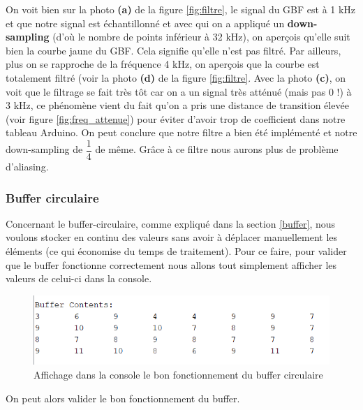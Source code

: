 \documentclass[a4paper,11pt]{article}
\begin{document}
On voit bien sur la photo \textbf{(a)} de la figure \ref{fig:filtre}, le signal du GBF est à 1 kHz et que notre signal est échantillonné et avec qui on a appliqué un \textbf{down-sampling} (d'où le nombre de points inférieur à 32 kHz), on aperçois qu'elle suit bien la courbe jaune du GBF. Cela signifie qu'elle n'est pas filtré. Par ailleurs, plus on se rapproche de la fréquence 4 kHz, on aperçois que la courbe est totalement filtré (voir la photo \textbf{(d)} de la figure \ref{fig:filtre}. Avec la photo \textbf{(c)}, on voit que le filtrage se fait très tôt car on a un signal très atténué (mais pas 0 !) à 3 kHz, ce phénomène vient du fait qu'on a pris une distance de transition élevée (voir figure \ref{fig:freq_attenue}) pour éviter d'avoir trop de coefficient dans notre tableau Arduino. On peut conclure que notre filtre a bien été implémenté et notre down-sampling de $\dfrac{1}{4}$ de même. Grâce à ce filtre nous aurons plus de problème d'aliasing.

\subsubsection{Buffer circulaire}
Concernant le buffer-circulaire, comme expliqué dans la section \ref{buffer}, nous voulons stocker en continu des valeurs sans avoir à déplacer manuellement les éléments (ce qui économise du temps de traitement). Pour ce faire, pour valider que le buffer fonctionne correctement nous allons tout simplement afficher les valeurs de celui-ci dans la console. 

\begin{figure}[H]
\begin{center}
\includegraphics[scale=0.7]{images/buffer.png}
\caption{Affichage dans la console le bon fonctionnement du buffer circulaire}
\end{center}
\end{figure}

On peut alors valider le bon fonctionnement du buffer.
\end{document}
